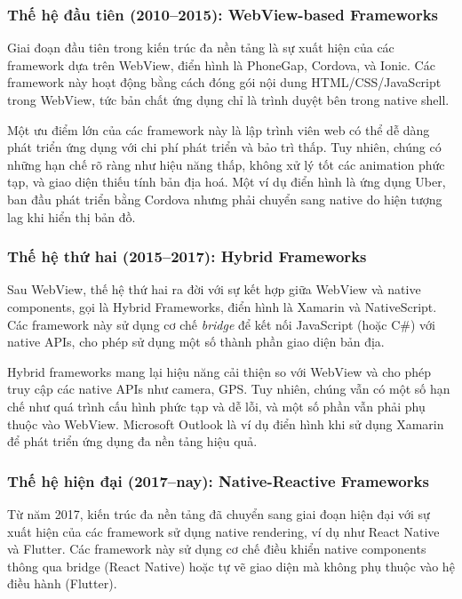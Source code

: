 \subsubsection{Thế hệ đầu tiên (2010–2015): WebView-based Frameworks}
Giai đoạn đầu tiên trong kiến trúc đa nền tảng là sự xuất hiện của các framework dựa trên WebView, điển hình là PhoneGap, Cordova, và Ionic. Các framework này hoạt động bằng cách đóng gói nội dung HTML/CSS/JavaScript trong WebView, tức bản chất ứng dụng chỉ là trình duyệt bên trong native shell.

\vspace{0.5em}

\indent Một ưu điểm lớn của các framework này là lập trình viên web có thể dễ dàng phát triển ứng dụng với chi phí phát triển và bảo trì thấp. Tuy nhiên, chúng có những hạn chế rõ ràng như hiệu năng thấp, không xử lý tốt các animation phức tạp, và giao diện thiếu tính bản địa hoá. Một ví dụ điển hình là ứng dụng Uber, ban đầu phát triển bằng Cordova nhưng phải chuyển sang native do hiện tượng lag khi hiển thị bản đồ.

\subsubsection{Thế hệ thứ hai (2015–2017): Hybrid Frameworks}

Sau WebView, thế hệ thứ hai ra đời với sự kết hợp giữa WebView và native components, gọi là Hybrid Frameworks, điển hình là Xamarin và NativeScript. Các framework này sử dụng cơ chế \textit{bridge} để kết nối JavaScript (hoặc C\#) với native APIs, cho phép sử dụng một số thành phần giao diện bản địa.

\vspace{0.5em}

\indent Hybrid frameworks mang lại hiệu năng cải thiện so với WebView và cho phép truy cập các native APIs như camera, GPS. Tuy nhiên, chúng vẫn có một số hạn chế như quá trình cấu hình phức tạp và dễ lỗi, và một số phần vẫn phải phụ thuộc vào WebView. Microsoft Outlook là ví dụ điển hình khi sử dụng Xamarin để phát triển ứng dụng đa nền tảng hiệu quả.

\subsubsection{Thế hệ hiện đại (2017–nay): Native-Reactive Frameworks}

 Từ năm 2017, kiến trúc đa nền tảng đã chuyển sang giai đoạn hiện đại với sự xuất hiện của các framework sử dụng native rendering, ví dụ như React Native và Flutter. Các framework này sử dụng cơ chế điều khiển native components thông qua bridge (React Native) hoặc tự vẽ giao diện mà không phụ thuộc vào hệ điều hành (Flutter).

